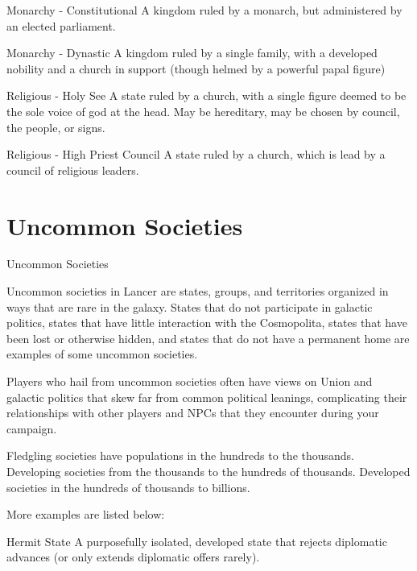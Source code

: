  Monarchy - Constitutional                             A kingdom ruled by a monarch, but
                                                       administered by an elected parliament.

 Monarchy - Dynastic                                   A kingdom ruled by a single family, with a
                                                       developed nobility and a church in support
                                                       (though helmed by a powerful papal figure)

 Religious - Holy See                                  A state ruled by a church, with a single figure
                                                       deemed to be the sole voice of god at the
                                                       head. May be hereditary, may be chosen by
                                                       council, the people, or signs.

 Religious - High Priest Council                       A state ruled by a church, which is lead by a
                                                       council of religious leaders.
\section{Uncommon Societies}
Uncommon Societies

Uncommon societies in Lancer are states, groups, and territories organized in ways that are rare
in the galaxy. States that do not participate in galactic politics, states that have little interaction
with the Cosmopolita, states that have been lost or otherwise hidden, and states that do not
have a permanent home are examples of some uncommon societies.


Players who hail from uncommon societies often have views on Union and galactic politics that
skew far from common political leanings, complicating their relationships with other players and
NPCs that they encounter during your campaign.


Fledgling societies have populations in the hundreds to the thousands. Developing societies
from the thousands to the hundreds of thousands. Developed societies in the hundreds of
thousands to billions.





More examples are listed below:


             Hermit State                         A purposefully isolated, developed state that rejects
                                                  diplomatic advances (or only extends diplomatic
                                                  offers rarely).

